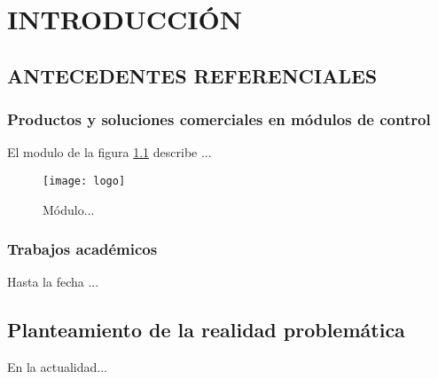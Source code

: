 \chapter{INTRODUCCIÓN}


\section{ANTECEDENTES REFERENCIALES}

\subsection{Productos y soluciones comerciales en módulos de control}
\begin{adjustwidth}{2.4em}{0em}
El modulo de la figura \ref{fig:logox} describe ...
\begin{figure}[H]
	\singlespacing
	\centering
	\texttt{[image: logo]}
	\caption[Módulo ...]{Módulo...}
	\label{fig:logox}
\end{figure}

\end{adjustwidth}

\subsection{Trabajos académicos}
\begin{adjustwidth}{2.4em}{0em}
Hasta la fecha ...
\end{adjustwidth}


\section{Planteamiento de la realidad problemática}
\begin{adjustwidth}{2.4em}{0em}
En la actualidad...
\end{adjustwidth}

